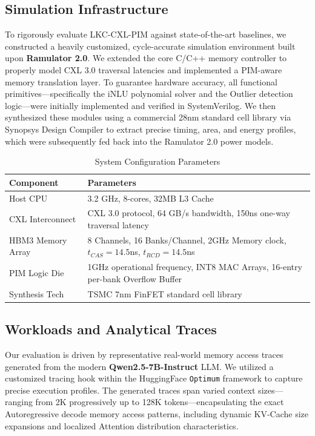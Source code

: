 \documentclass[10pt,conference]{IEEEtran}
\begin{document}
\subsection{Simulation Infrastructure}
To rigorously evaluate LKC-CXL-PIM against state-of-the-art baselines, we constructed a heavily customized, cycle-accurate simulation environment built upon \textbf{Ramulator 2.0}. We extended the core C/C++ memory controller to properly model CXL 3.0 traversal latencies and implemented a PIM-aware memory translation layer. To guarantee hardware accuracy, all functional primitives—specifically the iNLU polynomial solver and the Outlier detection logic—were initially implemented and verified in SystemVerilog. We then synthesized these modules using a commercial 28nm standard cell library via Synopsys Design Compiler to extract precise timing, area, and energy profiles, which were subsequently fed back into the Ramulator 2.0 power models.

\begin{table}[htbp]
\caption{System Configuration Parameters}
\centering
\begin{tabular}{lp{5cm}}
\toprule
\textbf{Component} & \textbf{Parameters} \\
\midrule
Host CPU              & 3.2 GHz, 8-cores, 32MB L3 Cache \\
CXL Interconnect      & CXL 3.0 protocol, 64 GB/s bandwidth, 150ns one-way traversal latency \\
HBM3 Memory Array     & 8 Channels, 16 Banks/Channel, 2GHz Memory clock, $t_{CAS}=14.5$ns, $t_{RCD}=14.5$ns \\
PIM Logic Die      & 1GHz operational frequency, INT8 MAC Arrays, 16-entry per-bank Overflow Buffer \\
Synthesis Tech & TSMC 7nm FinFET standard cell library \\
\bottomrule
\end{tabular}
\label{tab:system_config}
\end{table}

\subsection{Workloads and Analytical Traces}
Our evaluation is driven by representative real-world memory access traces generated from the modern \textbf{Qwen2.5-7B-Instruct} LLM. We utilized a customized tracing hook within the HuggingFace \texttt{Optimum} framework to capture precise execution profiles. The generated traces span varied context sizes—ranging from 2K progressively up to 128K tokens—encapsulating the exact Autoregressive decode memory access patterns, including dynamic KV-Cache size expansions and localized Attention distribution characteristics.
\end{document}

